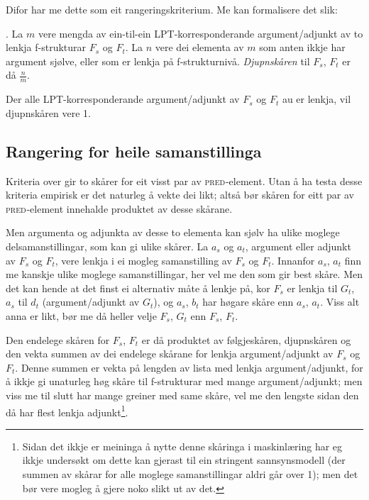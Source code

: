 \documentclass[11pt,a4paper,oneside,draft]{book}
\newcommand{\F}[2]{\textsc{#1}\ensuremath{_{#2}}}
\newcommand{\PRED}{\F{pred}{}}
\begin{document}
Difor har me dette som eit rangeringskriterium. Me kan formalisere det
slik:

\ex. \label{krav:sub-f-rate} La $m$ vere mengda av ein-til-ein
     LPT-korresponderande argument/adjunkt av to lenkja f-strukturar
     $F_s$ og $F_t$. La $n$ vere dei elementa av $m$ som anten ikkje
     har argument sjølve, eller som er lenkja på
     f-strukturnivå. \emph{Djupnskåren} til $F_s$, $F_t$ er då
     $\frac{n}{m}$.

Der alle LPT-korresponderande argument/adjunkt av $F_s$ og $F_t$ au er
lenkja, vil djupnskåren vere 1.

\subsection{Rangering for heile samanstillinga}
\label{sec-3.8.3}

Kriteria over gir to skårer for eit visst par av \PRED{}-element. Utan å
ha testa desse kriteria empirisk er det naturleg å vekte dei likt;
altså bør skåren for eitt par av \PRED{}-element innehalde produktet av
desse skårane.

Men argumenta og adjunkta av desse to elementa kan sjølv ha ulike
moglege delsamanstillingar, som kan gi ulike skårer. La $a_s$ og
$a_t$, argument eller adjunkt av $F_s$ og $F_t$, vere lenkja i ei
mogleg samanstilling av $F_s$ og $F_t$. Innanfor $a_s$, $a_t$ finn me
kanskje ulike moglege samanstillingar, her vel me den som gir best
skåre. Men det kan hende at det finst ei alternativ måte å lenkje på,
kor $F_s$ er lenkja til $G_t$, $a_s$ til $d_t$ (argument/adjunkt av
$G_t$), og $a_s$, $b_t$ har høgare skåre enn $a_s$, $a_t$. Viss alt
anna er likt, bør me då heller velje $F_s$, $G_t$ enn $F_s$, $F_t$.

Den endelege skåren for $F_s$, $F_t$ er då produktet av følgjeskåren,
djupnskåren og den vekta summen av dei endelege skårane for lenkja
argument/adjunkt av $F_s$ og $F_t$. Denne summen er vekta på lengden
av lista med lenkja argument/adjunkt, for å ikkje gi unaturleg høg
skåre til f-strukturar med mange argument/adjunkt; men viss me til
slutt har mange greiner med same skåre, vel me den lengste sidan den
då har flest lenkja adjunkt\footnote{Sidan det ikkje er meininga å nytte denne skåringa i
        maskinlæring har eg ikkje undersøkt om dette kan gjerast til
        ein stringent sannsynsmodell (der summen av skårar for alle
        moglege samanstillingar aldri går over 1); men det bør vere
        mogleg å gjere noko slikt ut av det. }.
\end{document}
